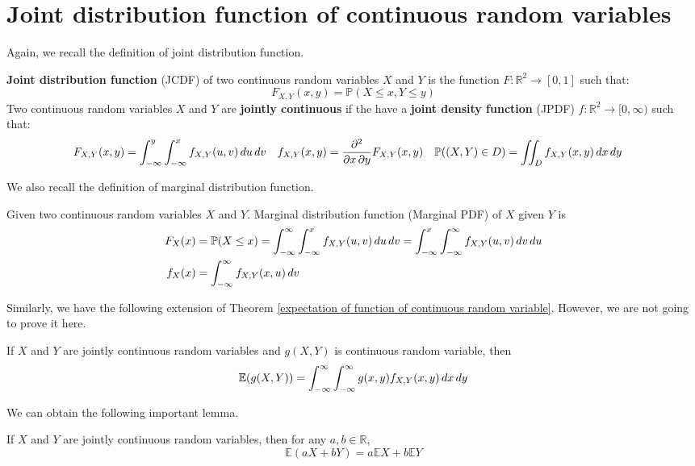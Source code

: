 \documentclass{huhtakm-template-book}
\newcommand{\prob}{\mathbb{P}}
\newcommand{\expect}{\mathbb{E}}
\begin{document}
\section{Joint distribution function of continuous random variables}
    Again, we recall the definition of joint distribution function.
    \begin{defn}
        \textbf{Joint distribution function} (JCDF) of two continuous  random variables $X$ and $Y$ is the function $F:\mathbb{R}^{2}\to[0,1]$ such that:
        \begin{equation*}
            F_{X,Y}(x,y)=\prob(X\leq x,Y\leq y)
        \end{equation*}
        Two continuous random variables $X$ and $Y$ are \textbf{jointly continuous} if the have a \textbf{joint density function} (JPDF) $f:\mathbb{R}^{2}\to[0,\infty)$ such that:
        \begin{align*}
            F_{X,Y}(x,y)&=\intlu{-\infty}{y}\intlu{-\infty}{x}f_{X,Y}(u,v)\,du\,dv & f_{X,Y}(x,y)&=\pdv*{F_{X,Y}(x,y)}{x,y} & \prob((X,Y)\in D)&=\iint_{D}f_{X,Y}(x,y)\,dx\,dy
        \end{align*}
    \end{defn}
    We also recall the definition of marginal distribution function.
    \begin{defn}
        Given two continuous random variables $X$ and $Y$. Marginal distribution function (Marginal PDF) of $X$ given $Y$ is
        \begin{align*}
            F_{X}(x)&=\prob(X\leq x)=\intinfty\intlu{-\infty}{x}f_{X,Y}(u,v)\,du\,dv=\intlu{-\infty}{x}\intinfty f_{X,Y}(u,v)\,dv\,du\\
            f_{X}(x)&=\intinfty f_{X,Y}(x,u)\,dv
        \end{align*}
    \end{defn}
    Similarly, we have the following extension of Theorem \ref{expectation of function of continuous random variable}. However, we are not going to prove it here.
    \begin{thm}
        If $X$ and $Y$ are jointly continuous random variables and $g(X,Y)$ is continuous random variable, then
        \begin{equation*}
            \expect(g(X,Y))=\intinfty\intinfty g(x,y)f_{X,Y}(x,y)\,dx\,dy
        \end{equation*}
    \end{thm}
    We can obtain the following important lemma.
    \begin{lem}
        If $X$ and $Y$ are jointly continuous random variables, then for any $a,b\in\mathbb{R}$,
        \begin{equation*}
            \expect(aX+bY)=a\expect X+b\expect Y
        \end{equation*}
    \end{lem}
\end{document}

